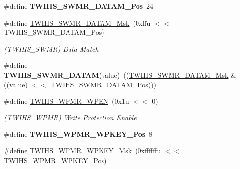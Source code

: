 \begin{DoxyCompactItemize}
\item 
\mbox{\label{group__SAME70__TWIHS_ga34b88e4924a202bc799ac6d80677c145}} 
\#define {\bfseries T\+W\+I\+H\+S\+\_\+\+S\+W\+M\+R\+\_\+\+D\+A\+T\+A\+M\+\_\+\+Pos}~24
\item 
\mbox{\label{group__SAME70__TWIHS_ga44cb1df1e94861a9fbb62974a8730e2f}} 
\#define \mbox{\hyperlink{group__SAME70__TWIHS_ga44cb1df1e94861a9fbb62974a8730e2f}{T\+W\+I\+H\+S\+\_\+\+S\+W\+M\+R\+\_\+\+D\+A\+T\+A\+M\+\_\+\+Msk}}~(0xffu $<$$<$ T\+W\+I\+H\+S\+\_\+\+S\+W\+M\+R\+\_\+\+D\+A\+T\+A\+M\+\_\+\+Pos)
\begin{DoxyCompactList}\small\item\em (T\+W\+I\+H\+S\+\_\+\+S\+W\+MR) Data Match \end{DoxyCompactList}\item 
\mbox{\label{group__SAME70__TWIHS_gaf81684051694e1b944089298917c1dcf}} 
\#define {\bfseries T\+W\+I\+H\+S\+\_\+\+S\+W\+M\+R\+\_\+\+D\+A\+T\+AM}(value)~((\mbox{\hyperlink{group__SAMV71__TWIHS_ga44cb1df1e94861a9fbb62974a8730e2f}{T\+W\+I\+H\+S\+\_\+\+S\+W\+M\+R\+\_\+\+D\+A\+T\+A\+M\+\_\+\+Msk}} \& ((value) $<$$<$ T\+W\+I\+H\+S\+\_\+\+S\+W\+M\+R\+\_\+\+D\+A\+T\+A\+M\+\_\+\+Pos)))
\item 
\mbox{\label{group__SAME70__TWIHS_ga0f5bbcefe4e29b43633d06b7a4d08c45}} 
\#define \mbox{\hyperlink{group__SAME70__TWIHS_ga0f5bbcefe4e29b43633d06b7a4d08c45}{T\+W\+I\+H\+S\+\_\+\+W\+P\+M\+R\+\_\+\+W\+P\+EN}}~(0x1u $<$$<$ 0)
\begin{DoxyCompactList}\small\item\em (T\+W\+I\+H\+S\+\_\+\+W\+P\+MR) Write Protection Enable \end{DoxyCompactList}\item 
\mbox{\label{group__SAME70__TWIHS_ga8d7157d7e310207cbaad1dc4f2773c6d}} 
\#define {\bfseries T\+W\+I\+H\+S\+\_\+\+W\+P\+M\+R\+\_\+\+W\+P\+K\+E\+Y\+\_\+\+Pos}~8
\item 
\mbox{\label{group__SAME70__TWIHS_gad433cad3185d19b00f7c05e49cbd7e13}} 
\#define \mbox{\hyperlink{group__SAME70__TWIHS_gad433cad3185d19b00f7c05e49cbd7e13}{T\+W\+I\+H\+S\+\_\+\+W\+P\+M\+R\+\_\+\+W\+P\+K\+E\+Y\+\_\+\+Msk}}~(0xffffffu $<$$<$ T\+W\+I\+H\+S\+\_\+\+W\+P\+M\+R\+\_\+\+W\+P\+K\+E\+Y\+\_\+\+Pos)

\end{DoxyCompactItemize}
